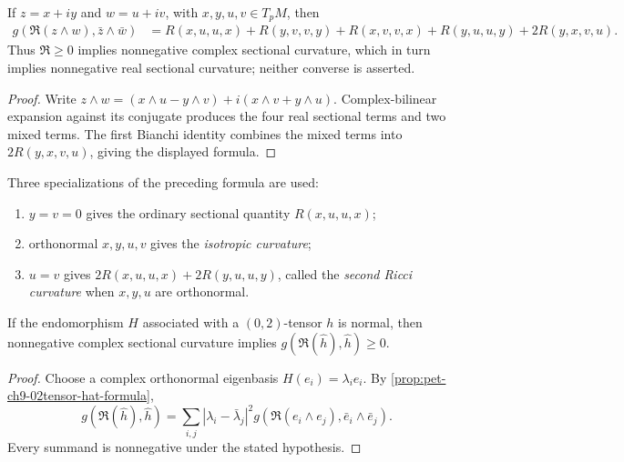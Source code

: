 \begin{lemma}
  \label{lem:pet-ch9-complex-sectional-curvature-real-formula}

  If $z=x+iy$ and $w=u+iv$, with $x,y,u,v\in T_pM$, then
  \begin{align*}
    g(\mathfrak{R}(z\wedge w),\bar z\wedge\bar w)
    &=R(x,u,u,x)+R(y,v,v,y)+R(x,v,v,x)+R(y,u,u,y)+2R(y,x,v,u).
  \end{align*}
  Thus $\mathfrak R\ge0$ implies nonnegative complex sectional curvature,
  which in turn implies nonnegative real sectional curvature; neither
  converse is asserted.
\end{lemma}
\begin{proof}
  \sketch
  Write
  \(z\wedge w=(x\wedge u-y\wedge v)+i(x\wedge v+y\wedge u)\).
  Complex-bilinear expansion against its conjugate produces the four real
  sectional terms and two mixed terms.  The first Bianchi identity combines
  the mixed terms into \(2R(y,x,v,u)\), giving the displayed formula.
\end{proof}

\begin{remark}
  \label{rem:pet-ch9-complex-sectional-curvature-special-cases}

  Three specializations of the preceding formula are used:
  \begin{enumerate}
    \item $y=v=0$ gives the ordinary sectional quantity $R(x,u,u,x)$;
    \item orthonormal $x,y,u,v$ gives the \emph{isotropic curvature};
    \item $u=v$ gives $2R(x,u,u,x)+2R(y,u,u,y)$, called the
      \emph{second Ricci curvature} when $x,y,u$ are orthonormal.
  \end{enumerate}
\end{remark}

\begin{proposition}
  \label{prop:pet-ch9-normal-tensor-nonneg-complex-sectional}

  If the endomorphism $H$ associated with a $(0,2)$-tensor $h$ is normal, then
  nonnegative complex sectional curvature implies
  $g(\mathfrak R(\hat h),\hat h)\ge0$.
\end{proposition}
\begin{proof}
  \sketch
  Choose a complex orthonormal eigenbasis \(H(e_i)=\lambda_ie_i\).  By
  \cref{prop:pet-ch9-02tensor-hat-formula},
  \[
    g(\mathfrak R(\hat h),\hat h)
      =\sum_{i,j}|\lambda_i-\bar\lambda_j|^2
        g(\mathfrak R(e_i\wedge e_j),\bar e_i\wedge\bar e_j).
  \]
  Every summand is nonnegative under the stated hypothesis.
\end{proof}

